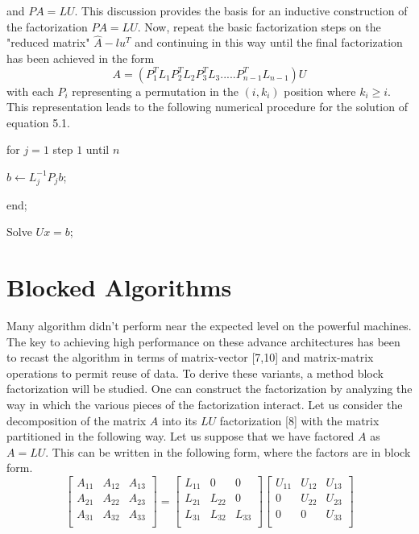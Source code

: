 and $PA = LU$. This discussion provides the basis for an inductive construction of the factorization $PA = LU$. Now, repeat the basic factorization steps on 
the "reduced matrix" $\hat{A}-lu^{T}$ and continuing in this way until the final factorization has been achieved in the form
\begin{equation}
A = (P_{1}^{T}L_{1}P_{2}^{T}L_{2}P_{3}^{T}L_{3}.....P_{n-1}^{T}L_{n-1})U
\end{equation} 
with each $P_{i}$ representing a permutation in the $(i, k_{i})$ position where $k_{i} \geq i$. This representation leads to the following numerical procedure
for the solution of equation 5.1.\par
\hspace{1in}for $j = 1$ step $1$ until $n$ \par
\hspace{1.4in}$b \leftarrow L_{j}^{-1}P_{j}b$;\par
\hspace{1in}end;\par
\hspace{1in}Solve $Ux = b$;

\section{Blocked Algorithms}
Many algorithm didn't perform near the expected level on the powerful machines. The key to achieving high performance on these advance architectures has been
to recast the algorithm in terms of matrix-vector [7,10] and matrix-matrix operations to permit reuse of data. To derive these variants, a method block
factorization will be studied. One can construct the factorization by analyzing the way in which the various pieces of the factorization interact. Let us
consider the decomposition of the matrix $A$ into its $LU$ factorization [8] with the matrix partitioned in the following way. Let us suppose that we have
factored
$A$ as $A = LU$. This can be written in the following form, where the factors are in block form.
\begin{equation}
\left[\begin{array}{lll}
A_{11} & A_{12} & A_{13}\\
A_{21} & A_{22} & A_{23}\\
A_{31} & A_{32} & A_{33}\\
\end{array}\right]=
\left[\begin{array}{lll}
L_{11} & 0 & 0\\
L_{21} & L_{22} & 0\\
L_{31} & L_{32} & L_{33}\\
\end{array}\right]     
\left[\begin{array}{lll}
U_{11} & U_{12} & U_{13}\\
0 & U_{22} & U_{23}\\
0 & 0 & U_{33}\\
\end{array}\right]
\end{equation}  


